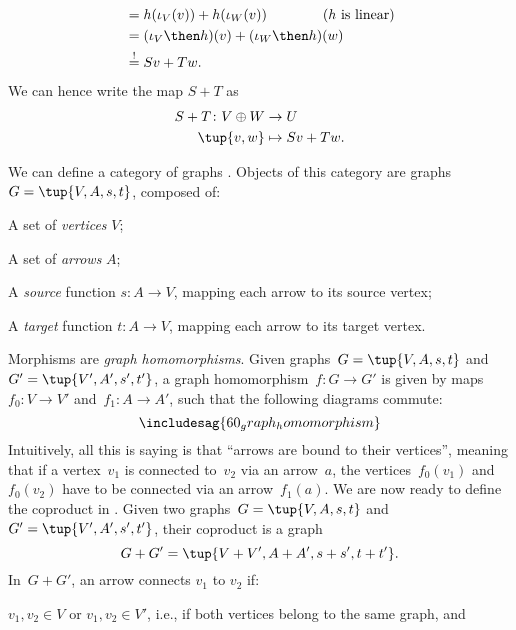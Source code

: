 \begin{example}
\begin{equation*}
\begin{aligned}
    &=h(\iota_V(v))+h(\iota_W(v)) \qquad \qquad (h \text{ is linear})\\
    &=(\iota_V\then h)(v)+(\iota_W\then h)(w)\\
    &\overset{!}{=}Sv+Tw.
    \end{aligned}
\end{equation*}
We can hence write the map $S+T$ as
\begin{equation*}
    \begin{aligned}
    S+T\colon V\oplus W&\to U\\
    \tup{v,w}&\mapsto Sv+Tw.
    \end{aligned}
\end{equation*}
\end{example}

\begin{example}
We can define a category of graphs \Graph. Objects of this category are graphs~$G=\tup{V,A,s,t}$, composed of:
\begin{compactitem}
\item A set of \emph{vertices} $V$;
\item A set of \emph{arrows} $A$;
\item A \emph{source} function $s\colon A\to V$, mapping each arrow to its source vertex;
\item A \emph{target} function $t\colon A\to V$, mapping each arrow to its target vertex.
\end{compactitem}
Morphisms are \emph{graph homomorphisms}. Given graphs~$G=\tup{V,A,s,t}$ and~$G'=\tup{V',A',s',t'}$, a graph homomorphism~$f\colon G\to G'$ is given by maps~$f_0\colon V\to V'$ and~$f_1\colon A\to A'$, such that the following diagrams commute:
\begin{equation*}
\includesag{60_graph_homomorphism}
\end{equation*}
Intuitively, all this is saying is that ``arrows are bound to their vertices'', meaning that if a vertex~$v_1$ is connected to~$v_2$ via an arrow~$a$, the vertices~$f_0(v_1)$ and~$f_0(v_2)$ have to be connected via an arrow~$f_1(a)$. We are now ready to define the coproduct in \Graph. Given two graphs~$G=\tup{V,A,s,t}$ and~$G'=\tup{V',A',s',t'}$, their coproduct is a graph
        \begin{equation*}
            G+G'=\tup{V+V',A+A',s+s',t+t'}.
        \end{equation*}
In~$G+G'$, an arrow connects $v_1$ to $v_2$ if:
\begin{compactitem}
\item $v_1,v_2\in V$ or $v_1,v_2\in V'$, i.e., if both vertices belong to the same graph, and

\end{compactitem}
\end{example}
